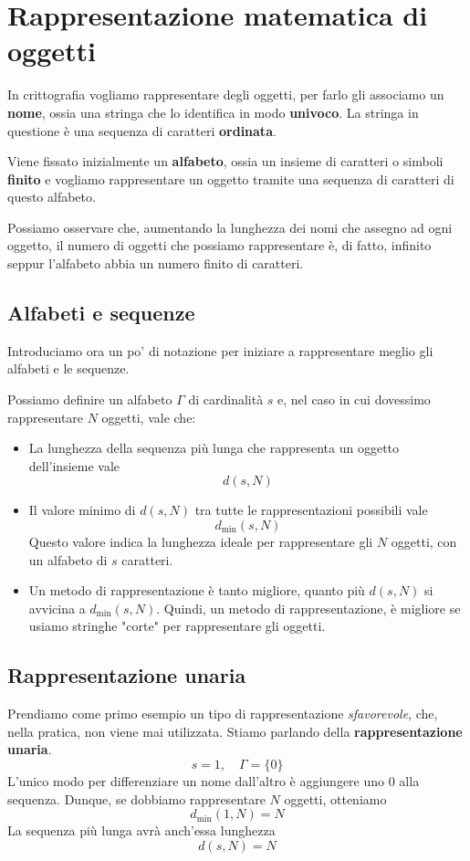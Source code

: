 \chapter{Rappresentazione matematica di oggetti}\label{rappresentazione}
In crittografia vogliamo rappresentare degli oggetti, per farlo gli associamo un \textbf{nome}, ossia una stringa che
lo identifica in modo \textbf{univoco}. La stringa in questione \`e una sequenza di caratteri \textbf{ordinata}.

Viene fissato inizialmente un \textbf{alfabeto}, ossia un insieme di caratteri o simboli \textbf{finito} e vogliamo
rappresentare un oggetto tramite una sequenza di caratteri di questo alfabeto.

Possiamo osservare che, aumentando la lunghezza dei nomi che assegno ad ogni oggetto, il numero di oggetti che possiamo
rappresentare \`e, di fatto, infinito seppur l'alfabeto abbia un numero finito di caratteri.

\section{Alfabeti e sequenze}\label{alfabeti}
Introduciamo ora un po' di notazione per iniziare a rappresentare meglio gli alfabeti e le sequenze.

Possiamo definire un alfabeto $\Gamma$ di cardinalit\`a $s$ e, nel caso in cui dovessimo rappresentare $N$ oggetti,
vale che:
\begin{itemize}
	\item La lunghezza della sequenza pi\`u lunga che rappresenta un oggetto dell'insieme vale
	      \[ d(s, N) \]
	\item Il valore minimo di $d(s, N)$ tra tutte le rappresentazioni possibili vale
	      \[ d_{\min}(s, N) \]
	      Questo valore indica la lunghezza ideale per rappresentare gli $N$ oggetti, con un alfabeto di $s$ caratteri.
	\item Un metodo di rappresentazione \`e tanto migliore, quanto pi\`u $d(s, N)$ si avvicina a $d_{\min}(s, N)$.
	      Quindi, un metodo di rappresentazione, \`e migliore se usiamo stringhe "corte" per rappresentare gli oggetti.
\end{itemize}

\section{Rappresentazione unaria}\label{rappresentazione_unaria}
Prendiamo come primo esempio un tipo di rappresentazione \emph{sfavorevole}, che, nella pratica, non viene mai
utilizzata. Stiamo parlando della \textbf{rappresentazione unaria}.
\[ s = 1, \quad \Gamma = \{ 0 \} \]
L'unico modo per differenziare un nome dall'altro \`e aggiungere uno $0$ alla sequenza. Dunque, se dobbiamo
rappresentare $N$ oggetti, otteniamo
\[ d_{\min}(1, N) = N \]
La sequenza pi\`u lunga avr\`a anch'essa lunghezza
\[ d(s, N) = N \]

